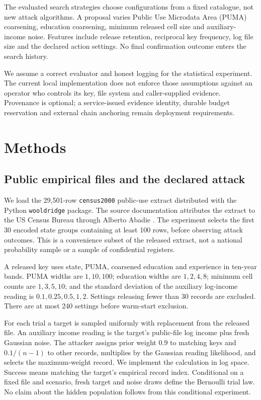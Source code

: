 \documentclass[11pt]{article}
\begin{document}
The evaluated search strategies choose configurations from a fixed catalogue, not new attack algorithms. A proposal varies Public Use Microdata Area (PUMA) coarsening, education coarsening, minimum released cell size and auxiliary-income noise. Features include release retention, reciprocal key frequency, log file size and the declared action settings. No final confirmation outcome enters the search history.

We assume a correct evaluator and honest logging for the statistical experiment. The current local implementation does not enforce those assumptions against an operator who controls its key, file system and caller-supplied evidence. Provenance is optional; a service-issued evidence identity, durable budget reservation and external chain anchoring remain deployment requirements.

\section{Methods}
\subsection{Public empirical files and the declared attack}
We load the 29,501-row \texttt{census2000} public-use extract distributed with the Python \texttt{wooldridge} package. The source documentation attributes the extract to the US Census Bureau through Alberto Abadie \cite{wooldridge}. The experiment selects the first 30 encoded state groups containing at least 100 rows, before observing attack outcomes. This is a convenience subset of the released extract, not a national probability sample or a sample of confidential registers.

A released key uses state, PUMA, coarsened education and experience in ten-year bands. PUMA widths are $1,10,100$; education widths are $1,2,4,8$; minimum cell counts are $1,3,5,10$; and the standard deviation of the auxiliary log-income reading is $0.1,0.25,0.5,1,2$. Settings releasing fewer than 30 records are excluded. There are at most 240 settings before warm-start exclusion.

For each trial a target is sampled uniformly with replacement from the released file. An auxiliary income reading is the target's public-file log income plus fresh Gaussian noise. The attacker assigns prior weight $0.9$ to matching keys and $0.1/(n-1)$ to other records, multiplies by the Gaussian reading likelihood, and selects the maximum-weight record. We implement the calculation in log space. Success means matching the target's empirical record index. Conditional on a fixed file and scenario, fresh target and noise draws define the Bernoulli trial law. No claim about the hidden population follows from this conditional experiment.
\end{document}
